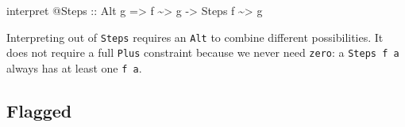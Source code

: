 \documentclass[]{article}
\newenvironment{Shaded}{}{}
\newcommand{\DataTypeTok}[1]{\textcolor[rgb]{0.56,0.13,0.00}{#1}}
\newcommand{\NormalTok}[1]{#1}
\newcommand{\OperatorTok}[1]{\textcolor[rgb]{0.40,0.40,0.40}{#1}}
\newcommand{\OtherTok}[1]{\textcolor[rgb]{0.00,0.44,0.13}{#1}}
\begin{document}
\begin{itemize}
\begin{Shaded}
\begin{Highlighting}[]
\NormalTok{interpret }\OperatorTok{@}\DataTypeTok{Steps}
\OtherTok{    ::} \DataTypeTok{Alt}\NormalTok{ g}
    \OtherTok{=>}\NormalTok{ f }\OperatorTok{\textasciitilde{}>}\NormalTok{ g}
    \OtherTok{{-}>} \DataTypeTok{Steps}\NormalTok{ f }\OperatorTok{\textasciitilde{}>}\NormalTok{ g}
\end{Highlighting}
\end{Shaded}

  Interpreting out of \texttt{Steps} requires an \texttt{Alt} to combine
  different possibilities. It does not require a full \texttt{Plus} constraint
  because we never need \texttt{zero}: a \texttt{Steps\ f\ a} always has at
  least one \texttt{f\ a}.
\end{itemize}

\hypertarget{flagged}{%
\subsection{Flagged}\label{flagged}}
\end{document}
